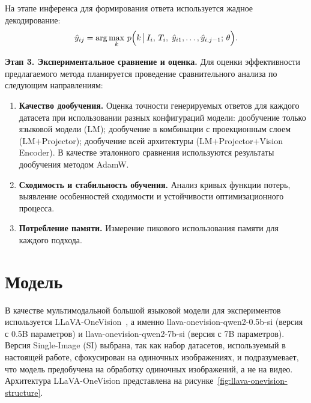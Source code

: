 \documentclass[LI,KR]{HSEUniversity}
\begin{document}
На этапе инференса для формирования ответа используется жадное декодирование:
$$
\hat{y}_{ij} = \arg\max_{k}\, p\Bigl(k \,\bigl|\, I_i,\, T_i,\; \hat{y}_{i1}, \dots, \hat{y}_{i,j-1};\, \theta\Bigr).
$$

\textbf{Этап 3. Экспериментальное сравнение и оценка.} Для оценки эффективности предлагаемого метода планируется проведение сравнительного анализа по следующим направлениям:
\begin{enumerate}
    \item \textbf{Качество дообучения.} Оценка точности генерируемых ответов для каждого датасета при использовании разных конфигураций модели:
дообучение только языковой модели (LM); дообучение в комбинации с проекционным слоем (LM+Projector); дообучение всей архитектуры (LM+Projector+Vision Encoder).
    В качестве эталонного сравнения используются результаты дообучения методом AdamW.
    \item \textbf{Сходимость и стабильность обучения.} Анализ кривых функции потерь, выявление особенностей сходимости и устойчивости оптимизационного процесса.
    \item \textbf{Потребление памяти.} Измерение пикового использования памяти для каждого подхода.
\end{enumerate}

\section{Модель}

В качестве мультимодальной большой языковой модели для экспериментов используется LLaVA-OneVision~\cite{llavaonevision},
а именно llava-onevision-qwen2-0.5b-si (версия с 0.5B параметров) и llava-onevision-qwen2-7b-si (версия с 7B параметров).
Версия Single-Image (SI) выбрана, так как набор датасетов, используемый в настоящей работе, сфокусирован на одиночных изображениях, и подразумевает, что модель предобучена на обработку одиночных изображений, а не на видео.
Архитектура LLaVA-OneVision представлена на рисунке~\ref{fig:llava-onevision-structure}.
\end{document}
